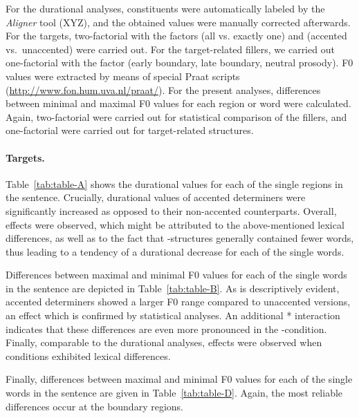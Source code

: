 \documentclass[fleqn,reqno,10pt,draft]{article}
\newcommand{\as}{\acro{as}}
\renewcommand{\es}{\acro{es}}
\begin{document}
For the durational analyses, constituents were automatically labeled
by the \emph{Aligner} tool (XYZ), and the
obtained values were manually corrected afterwards. For the targets,
two-factorial  with the factors  (all
vs. exactly one) and  (accented vs.~unaccented) were
carried out. For the target-related fillers, we carried out
one-factorial  with the factor  (early
boundary, late boundary, neutral prosody). F0 values were extracted by
means of special Praat scripts
(\url{http://www.fon.hum.uva.nl/praat/}). For the present analyses,
differences between minimal and maximal F0 values for each region or
word were calculated. Again, two-factorial  were carried
out for statistical comparison of the fillers, and one-factorial
 were carried out for target-related structures.

\paragraph{Targets.} Table~\ref{tab:table-A} shows the durational values for each of
the single regions in the sentence. Crucially, durational values of
accented determiners were significantly increased as opposed to their
non-accented counterparts. Overall,  effects were
observed, which might be attributed to the above-mentioned lexical
differences, as well as to the fact that \es-structures generally
contained fewer words, thus leading to a tendency of a durational
decrease for each of the single words.

Differences between maximal and minimal F0 values for each of the
single words in the sentence are depicted in
Table~\ref{tab:table-B}. As is descriptively evident, accented
determiners showed a larger F0 range compared to unaccented versions,
an effect which is confirmed by statistical analyses. An additional
* interaction indicates that these
differences are even more pronounced in the \as-condition. Finally,
comparable to the durational analyses,  effects were
observed when conditions exhibited lexical differences.

Finally, differences between maximal and minimal F0 values for each of
the single words in the sentence are given in
Table~\ref{tab:table-D}. Again, the most reliable differences occur at
the boundary regions.
\end{document}
